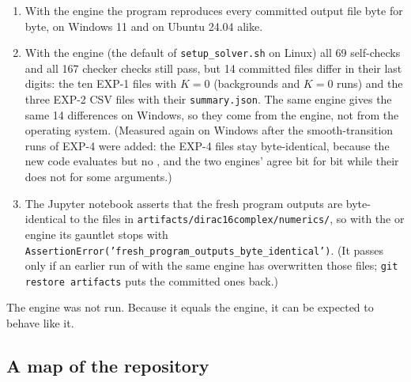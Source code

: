 \documentclass[11pt]{article}
\begin{document}
\begin{enumerate}
\item With the \texttt{} engine the program reproduces every committed output file byte for byte, on Windows 11 and on Ubuntu 24.04 alike.
\item With the \texttt{} engine (the default of \texttt{setup\_so\allowbreak{}lver.sh} on Linux) all 69 self-checks and all 167 checker checks still pass, but 14 committed files differ in their last digits: the ten EXP-1 files with $K=0$ (backgrounds and $K=0$ runs) and the three EXP-2 CSV files with their \texttt{summary.\allowbreak{}json}. The same engine gives the same 14 differences on Windows, so they come from the engine, not from the operating system. (Measured again on Windows after the smooth-transition runs of EXP-4 were added: the EXP-4 files stay byte-identical, because the new code evaluates \texttt{} but no \texttt{}, and the two engines' \texttt{} agree bit for bit while their \texttt{} does not for some arguments.)
\item The Jupyter notebook asserts that the fresh program outputs are byte-identical to the files in \texttt{artifact\allowbreak{}s/dirac1\allowbreak{}6complex\allowbreak{}/numeric\allowbreak{}s/}, so with the \texttt{} or \texttt{} engine its gauntlet stops with \texttt{Assertio\allowbreak{}nError('\allowbreak{}fresh\_pr\allowbreak{}ogram\_ou\allowbreak{}tputs\_by\allowbreak{}te\_ident\allowbreak{}ical')}. (It passes only if an earlier run of \texttt{} with the same engine has overwritten those files; \texttt{git rest\allowbreak{}ore arti\allowbreak{}facts} puts the committed ones back.)
\end{enumerate}

The \texttt{} engine was not run. Because it equals the \texttt{} engine, it can be expected to behave like it.

\subsection{A map of the repository}
\end{document}
